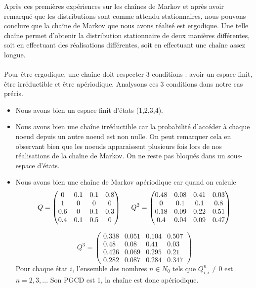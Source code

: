 \subsubsection{}
\label{section:1.1.4}
Après ces premières expériences sur les chaînes de Markov et après avoir remarqué que les distributions sont comme attendu stationnaires, nous pouvons conclure que la chaîne de Markov que nous avons réalisé est ergodique.
Une telle chaîne permet d'obtenir la distribution stationnaire de deux manières différentes, soit en effectuant des réalisations différentes, soit en effectuant une chaîne assez longue.
\\\\
Pour être ergodique, une chaîne doit respecter 3 conditions : avoir un espace finit, être irréductible et être apériodique. Analysons ces 3 conditions dans notre cas précis.

\begin{itemize}
  \item Nous avons bien un espace finit d'états (1,2,3,4).
  \item Nous avons bien une chaîne irréductible car la probabilité d'accéder à chaque noeud depuis un autre noeud est non nulle. On peut remarquer cela en observant bien que les noeuds apparaissent plusieurs fois lors de nos réalisations de la chaîne de Markov. On ne reste pas bloqués dans un sous-espace d'états.
  \item Nous avons bien une chaîne de Markov apériodique car quand on calcule 
  \begin{equation*}
    Q = \begin{pmatrix}
      0 & 0.1 & 0.1 & 0.8\\
      1 & 0 & 0 & 0\\
      0.6 & 0 & 0.1 & 0.3\\
      0.4 & 0.1 & 0.5 & 0
    \end{pmatrix}
    \hspace{0.5cm}
    Q^2 = \begin{pmatrix}
      0.48 & 0.08 & 0.41 & 0.03\\
      0 & 0.1 & 0.1 & 0.8\\
      0.18 & 0.09 & 0.22 & 0.51\\
      0.4 & 0.04 & 0.09 & 0.47
    \end{pmatrix}
  \end{equation*}

  \begin{equation*}
    Q^3 = \begin{pmatrix}
      0.338 & 0.051 & 0.104 & 0.507\\
      0.48 & 0.08 & 0.41 & 0.03\\
      0.426 & 0.069 & 0.295 & 0.21\\
      0.282 & 0.087 & 0.284 & 0.347
    \end{pmatrix}
\end{equation*}
Pour chaque état $i$, l'ensemble des nombres $n \in N_0$ tels que $Q_{i,i}^n \neq 0$ est $n = {2,3,...}$ Son PGCD est 1, la chaîne est donc apériodique.
\end{itemize}